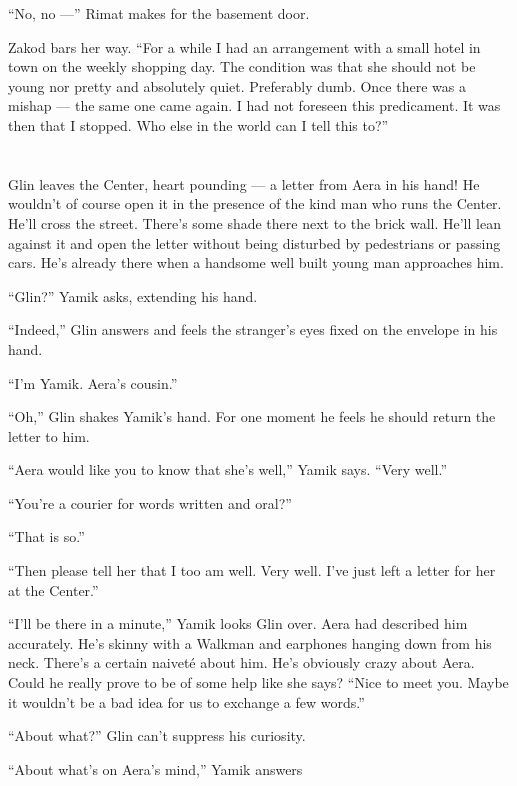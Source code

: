 \documentclass[twoside,11pt,openany]{book}
\begin{document}
``No, no ---'' Rimat makes for the basement door.

Zakod bars her way. ``For a while I had an arrangement with a small hotel in town on the weekly shopping
day. The condition was that she should not be young nor pretty and absolutely quiet. Preferably dumb.  Once there was a
mishap --- the same one came again. I had not foreseen this predicament. It was then that I stopped. Who else in the
world can I tell this to?''



\chapter{}

Glin leaves the Center, heart pounding --- a letter from Aera in his hand! He wouldn't of course open it in the
presence of the kind man who runs the Center. He'll cross the street. There's some shade there next to the brick wall.
He'll lean against it and open the letter without being disturbed by pedestrians or passing cars. He's already there
when a handsome well built young man approaches him.

``Glin?'' Yamik asks, extending his hand.

``Indeed,'' Glin answers and feels the stranger's eyes fixed on the envelope in his hand.

``I'm Yamik. Aera's cousin.''

``Oh,'' Glin shakes Yamik's hand. For one moment he feels he should return the letter to him.


``Aera would like you to know that she's well,'' Yamik says. ``Very
well.''

``You're a courier for words written and oral?''

``That is so.''

``Then please tell her that I too am well. Very well.  I've just left a letter for her at the
Center.''

``I'll be there in a minute,'' Yamik looks Glin over. Aera had described him accurately. He's
skinny with a Walkman and earphones hanging down from his neck. There's a certain naivet\'e about him. He's obviously
crazy about Aera. Could he really prove to be of some help like she says? ``Nice to meet you. Maybe it
wouldn't be a bad idea for us to exchange a few words.''

``About what?'' Glin can't suppress his curiosity.

``About what's on Aera's mind,'' Yamik answers
\end{document}

